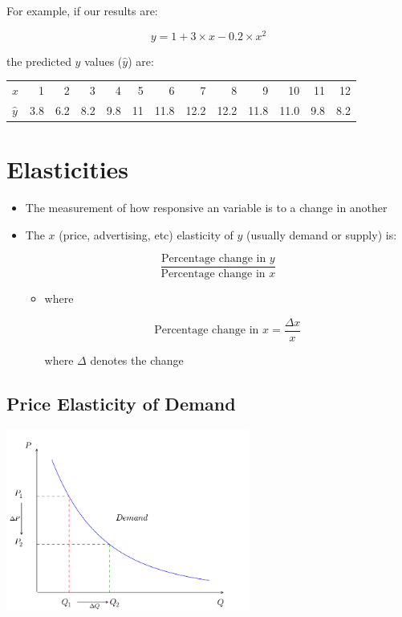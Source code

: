 \documentclass[10pt,article]{article}
\begin{document}
For example, if our results are:

\[ y = 1 + 3 \times x - 0.2 \times x^2 \]

the predicted \(y\) values (\(\hat y\)) are:

\begin{center}
\begin{tabular}{lrrrrrrrrrrrr}
\(x\) & 1 & 2 & 3 & 4 & 5 & 6 & 7 & 8 & 9 & 10 & 11 & 12\\
\(\hat y\) & 3.8 & 6.2 & 8.2 & 9.8 & 11 & 11.8 & 12.2 & 12.2 & 11.8 & 11.0 & 9.8 & 8.2\\
\end{tabular}
\end{center}
\section{Elasticities}
\label{sec:org71fa963}
\begin{itemize}
\item The measurement of how responsive an variable is to a change in another

\item The \(x\) (price, advertising, etc) elasticity of \(y\) (usually
demand or supply) is:

\[ \dfrac{\text{Percentage change in } y}{\text{Percentage change in } x} \]

\begin{itemize}
\item where

\[ \text{Percentage change in } x= \dfrac{\Delta x}{x} \]

where \(\Delta\) denotes the change
\end{itemize}
\end{itemize}
\subsection{Price Elasticity of Demand}
\label{sec:org1ec48cb}
\begin{center}
\includegraphics[width=8cm]{../../../Assets/Images/Regression/Price_elasticity_of_demand.png}
\end{center}
\end{document}
